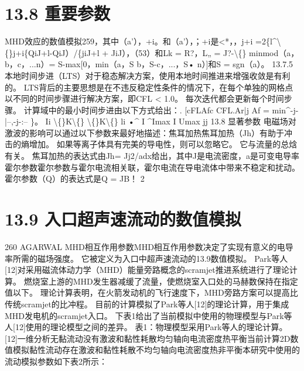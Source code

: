 \documentclass[UTF8,11pt,a4paper,openany,fontset=fandol]{ctexbook}
\begin{document}
\section{13.8 重要参数}
MHD效应的数值模拟259，其中（a'），+i。和（a'），；+i是<*，，j+i =2\{l\textasciicircum{}\textbackslash\{\}j+i\{QiJ+l-QiJ）/\{jiJ+l + JiJ），（53）和Lk = R?，L„ = J?-\textbackslash\{\} minmod（a，b，c，...n）= S-max[0，min（a，S b，S-c，...，S• n）]和S = sgn（a）。 13.7.5本地时间步进（LTS）对于稳态解决方案，使用本地时间推进来增强收敛是有利的。 LTS背后的主要思想是在不违反稳定性条件的情况下，在每个单独的网格点以不同的时间步骤进行解决方案，即CFL < 1.0。 每次迭代都会更新每个时间步骤。 计算域中的最小时间步进由以下方式给出：. [cFLAfc CFL.Ar|j Af = min\textasciicircum{}-j-|--,-j-:-- \}。 Ii \textbackslash\{\}K\textbackslash\{\} \textbackslash\{\}K\textbackslash\{\} li •\textasciicircum{} I \textasciicircum{}Imax I Umax jj 13.8 显著参数 电磁场对激波的影响可以通过以下参数来最好地描述：焦耳加热焦耳加热（Jh）有助于冲击的熵增加。 如果等离子体具有完美的导电性，则可以忽略它。 它与流量的总焓有关。 焦耳加热的表达式由Jh= Jj2/adx给出，其中J是电流密度，a是可变电导率霍尔参数霍尔参数与霍尔电流相关联，霍尔电流在导电流体中带来不稳定和扰动。 霍尔参数（Q）的表达式是Q = JB！ 2

\section{13.9 入口超声速流动的数值模拟}
260 AGARWAL MHD相互作用参数MHD相互作用参数决定了实现有意义的电导率所需的磁场强度。 它被定义为入口中超声速流动的13.9数值模拟。 Park等人[12]对采用磁流体动力学（MHD）能量旁路概念的scramjet推进系统进行了理论计算。 燃烧室上游的MHD发生器减缓了流量，使燃烧室入口处的马赫数保持在指定值以下。 理论计算表明，在火箭发动机的飞行速度下，MHD旁路方案可以提高比传统scramjet的比冲程。 目前的计算模拟了Park等人[12]的理论计算，用于集成MHD发电机的scramjet入口。 下表1给出了当前模拟中使用的物理模型与Park等人[12]使用的理论模型之间的差异。 表1：物理模型采用Park等人的理论计算。 [12]一维分析无黏流动没有激波和黏性耗散均匀轴向电流密度热平衡当前计算2D数值模拟黏性流动存在激波和黏性耗散不均匀轴向电流密度热非平衡本研究中使用的流动模拟参数如下表2所示：
\end{document}
